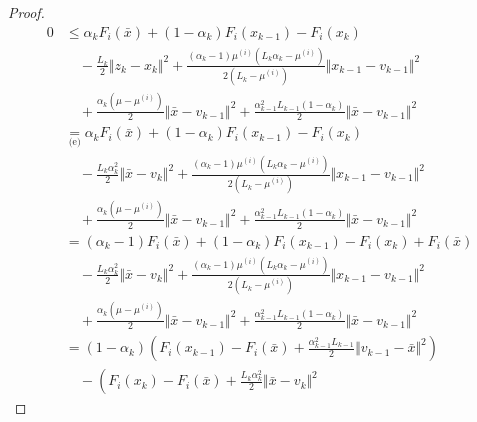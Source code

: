 \documentclass[12pt]{article}
\begin{document}
\begin{proof}
{            \begin{align*}
                0 &\le 
                \alpha_k F_i(\bar x) + (1 - \alpha_k)F_i(x_{k - 1}) - F_i(x_k) 
                    \\&\quad 
                    - \frac{L_k}{2}\Vert z_k - x_k\Vert^2 
                    + \frac{(\alpha_k - 1)\mu^{(i)}\left(L_k\alpha_k - \mu^{(i)}\right)}{2\left(L_k - \mu^{(i)}\right)}
                    \Vert x_{k - 1} - v_{k - 1} \Vert^2
                    \\ &\quad 
                    + \frac{\alpha_k(\mu - \mu^{(i)})}{2} \Vert \bar x - v_{k - 1}\Vert^2
                    + \frac{\alpha_{k - 1}^2L_{k - 1}(1 - \alpha_k)}{2} \Vert \bar x - v_{k - 1}\Vert^2
                \\
                &\underset{\text{(e)}}{=} 
                \alpha_k F_i(\bar x) + (1 - \alpha_k)F_i(x_{k - 1}) - F_i(x_k) 
                    \\&\quad 
                    - \frac{L_k\alpha_k^2}{2}\Vert \bar x - v_k\Vert^2 
                    + \frac{(\alpha_k - 1)\mu^{(i)}\left(L_k\alpha_k - \mu^{(i)}\right)}{2\left(L_k - \mu^{(i)}\right)}
                    \Vert x_{k - 1} - v_{k - 1} \Vert^2
                    \\ &\quad 
                    + \frac{\alpha_k(\mu - \mu^{(i)})}{2} \Vert \bar x - v_{k - 1}\Vert^2
                    + \frac{\alpha_{k - 1}^2L_{k - 1}(1 - \alpha_k)}{2} \Vert \bar x - v_{k - 1}\Vert^2
                \\
                &= (\alpha_k - 1)F_i(\bar x) + (1 - \alpha_k)F_i(x_{k - 1}) - F_i(x_k) + F_i(\bar x)
                    \\&\quad 
                    - \frac{L_k\alpha_k^2}{2}\Vert \bar x - v_k\Vert^2 
                    + \frac{(\alpha_k - 1)\mu^{(i)}\left(L_k\alpha_k - \mu^{(i)}\right)}{2\left(L_k - \mu^{(i)}\right)}\Vert x_{k - 1} - v_{k - 1} \Vert^2
                    \\ &\quad 
                    + \frac{\alpha_k(\mu - \mu^{(i)})}{2} \Vert \bar x - v_{k - 1}\Vert^2
                    + \frac{\alpha_{k - 1}^2L_{k - 1}(1 - \alpha_k)}{2} \Vert \bar x - v_{k - 1}\Vert^2
                \\
                &= (1 - \alpha_k)\left(
                    F_i(x_{k - 1}) - F_i(\bar x) + \frac{\alpha_{k - 1}^2L_{k - 1}}{2}\Vert v_{k - 1} - \bar x\Vert^2
                \right) 
                    \\ & \quad
                    - \left(
                        F_i(x_{k}) - F_i(\bar x) + \frac{L_k\alpha_k^2}{2}\Vert \bar x - v_k\Vert^2 

\end{align*}}
\end{proof}
\end{document}
